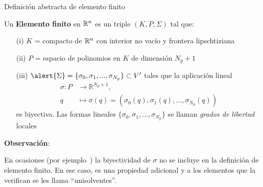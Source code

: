 \documentclass[10pt,leqno]{beamer}
\newcommand{\Np}{{N_p}}
\begin{document}
\begin{frame}{Definición abstracta de elemento finito}
  \begin{definition}
    Un \textbf{\alert{Elemento finito}} en ${\mathbb R}^n$ es un triple
    $(K,P,\Sigma)$ tal que:
    \smallskip
    \begin{itemize}
    \item[(i)] \alert{$K$} = compacto de ${\mathbb R}^n$ con interior no vac\'io y
      frontera lipschtiziana
    \item[(ii)] \alert{$P$} = espacio de polinomios en $K$ de dimensi\'on $\Np+1$
    \item[(iii)] $\alert{\Sigma}=\{\sigma_0,\sigma_1,...,\sigma_{\Np}\} \subset V'$
      tales que la aplicaci\'on lineal
      \begin{align*}
        \sigma: P& \longrightarrow \mathbb{R}^{\Np+1},\\
        q& \longmapsto \sigma(q)=(\sigma_0(q), \sigma_1(q),..., \sigma_{\Np}(q))
      \end{align*}
      es biyectiva. Las formas lineales
      $\{\sigma_0,\sigma_1,...,\sigma_{\Np}\}$ se llaman
      \textit{grados de libertad} locales
    \end{itemize}
  \end{definition}

  \par\bigskip
  \scriptsize \textbf{Observación}:
  \par\medskip
  En ocasiones (por
  ejemplo~\cite{Ciarlet:78}) la biyectividad de $\sigma$ no se incluye
  en la definición de elemento finito. En ese caso, es una propiedad
  adicional y a los elementos que la verifican se les llama
  ``unisolventes''.
\end{frame}
\end{document}
